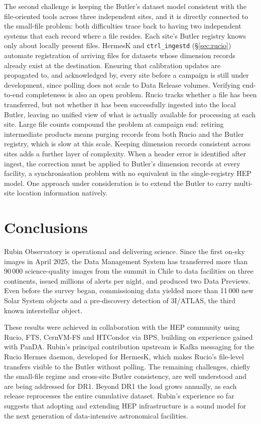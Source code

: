 The second challenge is keeping the Butler's dataset model consistent with the file-oriented tools across three independent sites, and it is directly connected to the small-file problem: both difficulties trace back to having two independent systems that each record where a file resides.
Each site's Butler registry knows only about locally present files.
HermesK and \texttt{ctrl\_ingestd} (\S\ref{sec:rucio}) automate registration of arriving files for datasets whose dimension records already exist at the destination.
Ensuring that calibration updates are propagated to, and acknowledged by, every site before a campaign is still under development, since polling does not scale to Data Release volumes.
Verifying end-to-end completeness is also an open problem.
Rucio tracks whether a file has been transferred, but not whether it has been successfully ingested into the local Butler, leaving no unified view of what is actually available for processing at each site.
Large file counts compound the problem at campaign end: retiring intermediate products means purging records from both Rucio and the Butler registry, which is slow at this scale.
Keeping dimension records consistent across sites adds a further layer of complexity.
When a header error is identified after ingest, the correction must be applied to Butler's dimension records at every facility, a synchronisation problem with no equivalent in the single-registry HEP model.
One approach under consideration is to extend the Butler to carry multi-site location information natively.

\section{Conclusions}
\label{sec:conclusions}

Rubin Observatory is operational and delivering science.
Since the first on-sky images in April 2025, the Data Management System has transferred more than 90\,000 science-quality images from the summit in Chile to data facilities on three continents, issued millions of alerts per night, and produced two Data Previews.
Even before the survey began, commissioning data yielded more than 11\,000 new Solar System objects and a pre-discovery detection of 3I/ATLAS, the third known interstellar object.

These results were achieved in collaboration with the HEP community using Rucio, FTS, CernVM-FS and HTCondor via BPS, building on experience gained with PanDA.
Rubin's principal contribution upstream is Kafka messaging for the Rucio Hermes daemon, developed for HermesK, which makes Rucio's file-level transfers visible to the Butler without polling.
The remaining challenges, chiefly the small-file regime and cross-site Butler consistency, are well understood and are being addressed for DR1.
Beyond DR1 the load grows annually, as each release reprocesses the entire cumulative dataset.
Rubin's experience so far suggests that adopting and extending HEP infrastructure is a sound model for the next generation of data-intensive astronomical facilities.

